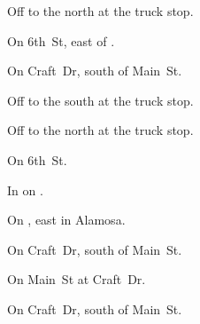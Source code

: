 
\begin{LocationList}

Off  to the north at the truck stop.

On  6th~St, east of .

On Craft~Dr, south of   Main~St.

\Location{\GarageHQ \Garage}
Off  to the south at the truck stop.

Off  to the north at the truck stop.

\Location{\RecruitmentAgency \Recruitment}
On  6th~St.

In  on .

\Location{\TruckStop \Gas \Rest \Service}
On , east in Alamosa.

On Craft~Dr, south of   Main~St.

On   Main~St at Craft~Dr.

On Craft~Dr, south of   Main~St.

\end{LocationList}

